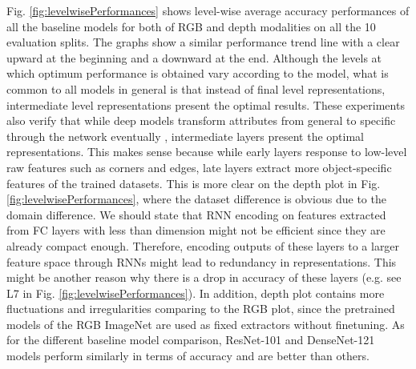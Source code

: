 \documentclass[10pt,journal,compsoc]{IEEEtran}
\begin{document}
Fig. \ref{fig:levelwisePerformances} shows level-wise average accuracy performances of all the baseline models for both of RGB and depth modalities on all the 10 evaluation splits. The graphs show a similar performance trend line with a clear upward at the beginning and a downward at the end. Although the levels at which optimum performance is obtained vary according to the model, what is common to all models in general is that instead of final level representations, intermediate level representations present the optimal results. These experiments also verify that while deep models transform attributes from general to specific through  the network eventually \cite{Razavian_CVPRW_2014, Zeiler_ECCV_2014}, intermediate layers present the optimal representations. This makes sense because while early layers response to low-level raw features such as corners and edges, late layers extract more object-specific features of the trained datasets. This is more clear on the depth plot in Fig. \ref{fig:levelwisePerformances}, where the dataset difference is obvious due to the domain difference. We should state that RNN encoding on features extracted from FC layers with less than  dimension might not be efficient since they are already compact enough. Therefore, encoding outputs of these layers to a larger feature space through RNNs might lead to redundancy in representations. This might be another reason why there is a drop in accuracy of these layers (e.g. see L7 in Fig. \ref{fig:levelwisePerformances}). In addition, depth plot contains more fluctuations and irregularities comparing to the RGB plot, since the pretrained models of the RGB ImageNet are used as fixed extractors without finetuning. As for the different baseline model comparison, ResNet-101 and DenseNet-121 models perform similarly in terms of accuracy and are better than others.
\end{document}
